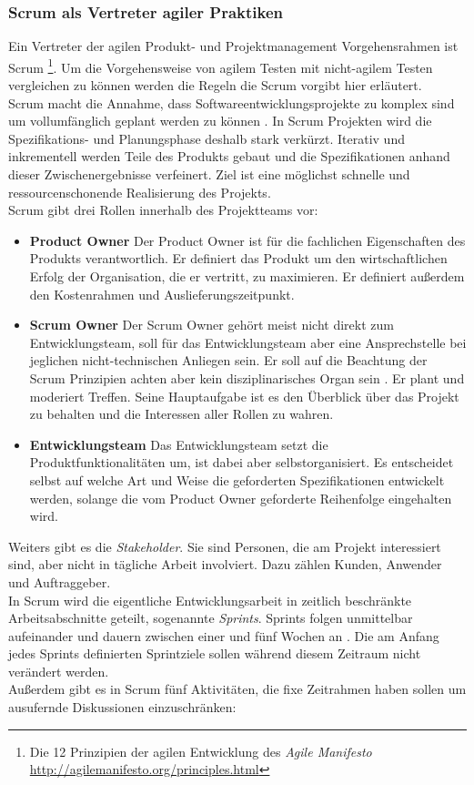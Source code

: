 \subsubsection{Scrum als Vertreter agiler Praktiken}
\label{sec:scrum}
Ein Vertreter der agilen Produkt- und Projektmanagement Vorgehensrahmen ist Scrum \footnote{Die 12 Prinzipien der agilen Entwicklung des \textit{Agile Manifesto} \url{http://agilemanifesto.org/principles.html}}. Um die Vorgehensweise von agilem Testen mit nicht-agilem Testen vergleichen zu können werden die Regeln die Scrum vorgibt hier erläutert.\\
Scrum macht die Annahme, dass Softwareentwicklungsprojekte zu komplex sind um vollumfänglich geplant werden zu können \cite{linz_testing_2014}. In Scrum Projekten wird die Spezifikations- und Planungsphase deshalb stark verkürzt. Iterativ und inkrementell werden Teile des Produkts gebaut und die Spezifikationen anhand dieser Zwischenergebnisse verfeinert. Ziel ist eine möglichst schnelle und ressourcenschonende Realisierung des Projekts.\\
Scrum gibt drei Rollen innerhalb des Projektteams vor:

\begin{itemize}
\item \textbf{Product Owner} Der Product Owner ist für die fachlichen Eigenschaften des Produkts verantwortlich. Er definiert das Produkt um den wirtschaftlichen Erfolg der Organisation, die er vertritt, zu maximieren. Er definiert außerdem den Kostenrahmen und Auslieferungszeitpunkt.
\item \textbf{Scrum Owner} Der Scrum Owner gehört meist nicht direkt zum Entwicklungsteam, soll für das Entwicklungsteam aber eine Ansprechstelle bei jeglichen nicht-technischen Anliegen sein. Er soll auf die Beachtung der Scrum Prinzipien achten aber kein disziplinarisches Organ sein \cite{linz_testing_2014}. Er plant und moderiert Treffen. Seine Hauptaufgabe ist es den Überblick über das Projekt zu behalten und die Interessen aller Rollen zu wahren.
\item \textbf{Entwicklungsteam} Das Entwicklungsteam setzt die Produktfunktionalitäten um, ist dabei aber selbstorganisiert. Es entscheidet selbst auf welche Art und Weise die geforderten Spezifikationen entwickelt werden, solange die vom Product Owner geforderte Reihenfolge eingehalten wird.
\end{itemize}

Weiters gibt es die \textit{Stakeholder}. Sie sind Personen, die am Projekt interessiert sind, aber nicht in tägliche Arbeit involviert. Dazu zählen Kunden, Anwender und Auftraggeber.\\
In Scrum wird die eigentliche Entwicklungsarbeit in zeitlich beschränkte Arbeitsabschnitte geteilt, sogenannte \textit{Sprints}. Sprints folgen unmittelbar aufeinander und dauern zwischen einer und fünf Wochen an \cite{linz_testing_2014}. Die am Anfang jedes Sprints definierten Sprintziele sollen während diesem Zeitraum nicht verändert werden.\\
Außerdem gibt es in Scrum fünf Aktivitäten, die fixe Zeitrahmen haben sollen um ausufernde Diskussionen einzuschränken:

